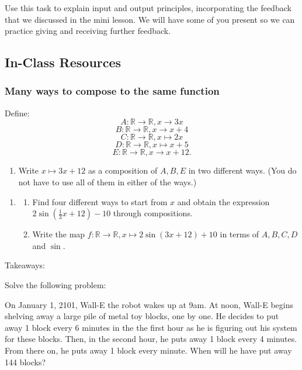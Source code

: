 \documentclass[11pt]{article}
\newcommand{\handout}{\subsubsection}
\newenvironment{task}
	{\begin{mdframed}[linecolor=lightgray, linewidth=3pt]\raggedright}
	{\end{mdframed}}
\newcommand{\R}{\mathbb{R}}
\theoremstyle{definition}
\begin{document}
\begin{task}
Use this task to explain input and output principles, incorporating the feedback that we discussed in the mini lesson. We will have some of you present so we can practice giving and receiving further feedback.
\end{task}


\newpage \subsection{In-Class Resources}  
\handout{Many ways to compose to the same function}


Define:
$$A:\R\to \R, x\to 3x$$
$$B:\R\to \R, x\to x+4$$
$$C:\R\to \R,x\mapsto 2x$$
$$D:\R\to \R,x\mapsto x+5$$
$$E:\R\to\R, x\to x+12.$$



\begin{enumerate}
\item Write $x\mapsto 3x+12$ as a composition of $A, B, E$ in two different ways. (You do not have to use all of them in either of the ways.)
\end{enumerate}


\vfill

\begin{enumerate}[resume] 
\item \begin{enumerate}
\item Find four different ways to start from $x$ and obtain the expression $2\sin(\frac{1}{3}x+12)-10$ through compositions.
\item Write the map $f:\R\to\R, x\mapsto 2\sin(3x+12)+10$ in terms of $A, B, C, D$ and $\sin$. 
\end{enumerate}
\end{enumerate}

\vfill 

Takeaways:
\vfill


Solve the following problem:

\begin{mdframed}
On January 1, 2101, Wall-E the robot wakes up at 9am. At noon, Wall-E begins shelving away a large pile of metal toy blocks, one by one. He decides to put away 1 block every 6 minutes in the the first hour as he is figuring out his system for these blocks. Then, in the second hour, he puts away 1 block every 4 minutes. From there on, he puts away 1 block every minute. When will he have put away 144 blocks?
\end{mdframed}
\end{document}
